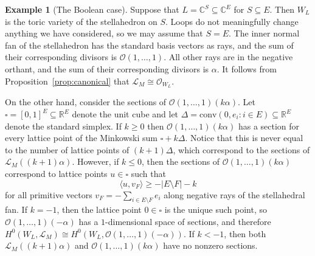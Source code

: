 \documentclass{amsart}
\newcommand{\F}{\mathbb{C}}
\newcommand{\R}{\mathbb{R}}
\theoremstyle{definition}
\newtheorem{example}[theorem]{Example}
\begin{document}
\begin{example}[The Boolean case]\label{LO-boolean} Suppose that $L = \F^S \subseteq \F^E$ for $S 
    \subseteq E$. Then $W_L$ is the toric variety of the stellahedron on 
    $S$. Loops do not meaningfully change anything we have considered, 
    so we may assume that $S = E$. The inner normal 
    fan of the stellahedron has the standard basis 
    vectors as rays, and the sum of their corresponding divisors is 
    $\mathcal{O}(1, \ldots, 1)$. All other rays are in the negative 
    orthant, and the sum of their corresponding divisors is 
    $\alpha$. It follows from Proposition~\ref{prop:canonical} that $\mathcal{L}_M \cong \mathcal{O}_{W_L}$. 

    On the other hand, consider the 
    sections of $\mathcal{O}(1, \ldots, 
    1)(k\alpha)$. Let $\square = [0,1]^E \subseteq \R^E$ denote the unit 
    cube and let $\Delta = \text{conv}(0, e_i : i \in E) \subseteq 
    \R^E$ denote the standard simplex. If $k \geq 0$ then $\mathcal{O}(1, 
    \ldots, 1)(k\alpha)$ has a section for every lattice point of 
    the Minkowski sum $\square + k \Delta$. Notice that this is never 
    equal to the number of lattice points of $(k+1)\Delta$, which 
    correspond to the sections of $\mathcal{L}_M((k+1)\alpha)$.
    However, if $k \leq 0$, then the sections of 
    $\mathcal{O}(1, \ldots, 1)(k\alpha)$ correspond to lattice 
    points $u \in \square$ such that 
    \[
        \langle u, v_F \rangle \geq -|E\setminus F| - k
    \]
    for all primitive vectors $v_F = -\sum_{i \in E \setminus F} e_i$ 
    along negative rays of the stellahedral fan. If $k = -1$, 
    then the lattice point $0 \in \square$ is the unique 
    such point, so $\mathcal{O}(1, \ldots, 1)(-\alpha)$ has a $1$-dimensional space of sections, and therefore $H^0(W_L, \mathcal{L}_M) \cong 
    H^0(W_L, \mathcal{O}(1, \ldots, 1)(-\alpha))$. If $k < -1$, then 
    both $\mathcal{L}_M((k+1)\alpha)$ and $\mathcal{O}(1, \ldots, 
    1)(k\alpha)$ have no nonzero sections.
\end{example}
\end{document}
